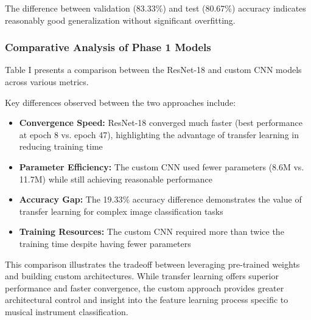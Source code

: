 The difference between validation (83.33\%) and test (80.67\%) accuracy indicates reasonably good generalization without significant overfitting.


\subsubsection{Comparative Analysis of Phase 1 Models}
Table I presents a comparison between the ResNet-18 and custom CNN models across various metrics.


Key differences observed between the two approaches include:
\begin{itemize}
    \item \textbf{Convergence Speed:} ResNet-18 converged much faster (best performance at epoch 8 vs. epoch 47), highlighting the advantage of transfer learning in reducing training time
    \item \textbf{Parameter Efficiency:} The custom CNN used fewer parameters (8.6M vs. 11.7M) while still achieving reasonable performance
    \item \textbf{Accuracy Gap:} The 19.33\% accuracy difference demonstrates the value of transfer learning for complex image classification tasks
    \item \textbf{Training Resources:} The custom CNN required more than twice the training time despite having fewer parameters
\end{itemize}

This comparison illustrates the tradeoff between leveraging pre-trained weights and building custom architectures. While transfer learning offers superior performance and faster convergence, the custom approach provides greater architectural control and insight into the feature learning process specific to musical instrument classification.

